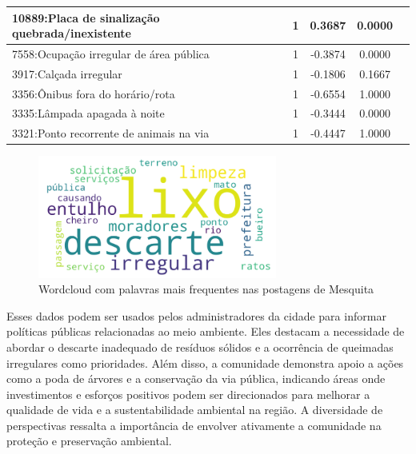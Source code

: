 \begin{table}[htbp]
\begin{tabular}{|l|c|c|c|c|}
		10889:Placa de sinalização quebrada/inexistente & 1                & 0.3687         & 0.0000           \\
		\hline
		7558:Ocupação irregular de área pública         & 1                & -0.3874        & 0.0000           \\
		\hline
		3917:Calçada irregular                          & 1                & -0.1806        & 0.1667           \\
		\hline
		3356:Ônibus fora do horário/rota                & 1                & -0.6554        & 1.0000           \\
		\hline
		3335:Lâmpada apagada à noite                    & 1                & -0.3444        & 0.0000           \\
		\hline
		3321:Ponto recorrente de animais na via         & 1                & -0.4447        & 1.0000           \\
		\hline
	\end{tabular}
\end{table}

\begin{figure}[htb]
	\centering
	\includegraphics[width=0.7\textwidth]{images/wordcloud_mesquita.png}
	\caption{Wordcloud com palavras mais frequentes nas postagens de Mesquita}
	\label{fig:wordcloud_mesquita}
\end{figure}

Esses dados podem ser usados pelos administradores da cidade para informar políticas públicas relacionadas ao meio ambiente. Eles destacam a necessidade de abordar o descarte inadequado de resíduos sólidos e a ocorrência de queimadas irregulares como prioridades. Além disso, a comunidade demonstra apoio a ações como a poda de árvores e a conservação da via pública, indicando áreas onde investimentos e esforços positivos podem ser direcionados para melhorar a qualidade de vida e a sustentabilidade ambiental na região. A diversidade de perspectivas ressalta a importância de envolver ativamente a comunidade na proteção e preservação ambiental.

